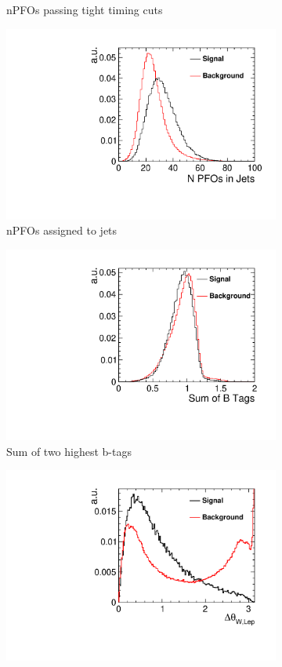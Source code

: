 \begin{figure}[]
\begin{subfigure}[]{0.5\linewidth}
    \caption{nPFOs passing tight timing cuts} 
    \vspace{4ex}
  \end{subfigure}%
  \begin{subfigure}[]{0.5\linewidth}
    \centering
    \includegraphics[width=0.75\linewidth]{Appendix/figures/PFOsInJets} 
    \caption{nPFOs assigned to jets} 
    \vspace{4ex}
  \end{subfigure} 
  \begin{subfigure}[]{0.5\linewidth}
    \centering
    \includegraphics[width=0.75\linewidth]{Appendix/figures/SumBTags} 
    \caption{Sum of two highest b-tags} 
     \vspace{4ex}
 \end{subfigure}%
  \begin{subfigure}[]{0.5\linewidth}
    \centering
    \includegraphics[width=0.75\linewidth]{Appendix/figures/WqqLepAngSep} 

\end{subfigure}
\end{figure}
